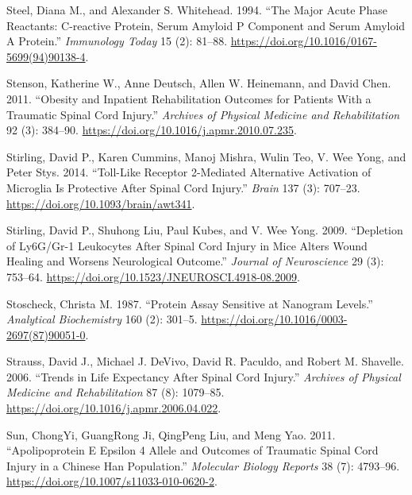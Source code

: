 \documentclass[9pt,lineno]{elife}
\newlength{\cslhangindent}
\newlength{\cslentryspacingunit} %
\newenvironment{CSLReferences}[2] %
 {%
  \setlength{\parindent}{0pt}
  \ifodd #1
  \let\oldpar\par
  \def\par{\hangindent=\cslhangindent\oldpar}
  \fi
  \setlength{\parskip}{#2\cslentryspacingunit}
 }%
 {}
\begin{document}
\begin{CSLReferences}{1}{0}
\leavevmode{}%
Steel, Diana M., and Alexander S. Whitehead. 1994. {``The Major Acute Phase Reactants: {C-reactive} Protein, Serum Amyloid {P} Component and Serum Amyloid {A} Protein.''} \emph{Immunology Today} 15 (2): 81--88. \url{https://doi.org/10.1016/0167-5699(94)90138-4}.

\leavevmode{}%
Stenson, Katherine W., Anne Deutsch, Allen W. Heinemann, and David Chen. 2011. {``Obesity and {Inpatient Rehabilitation Outcomes} for {Patients With} a {Traumatic Spinal Cord Injury}.''} \emph{Archives of Physical Medicine and Rehabilitation} 92 (3): 384--90. \url{https://doi.org/10.1016/j.apmr.2010.07.235}.

\leavevmode{}%
Stirling, David P., Karen Cummins, Manoj Mishra, Wulin Teo, V. Wee Yong, and Peter Stys. 2014. {``Toll-Like Receptor 2-Mediated Alternative Activation of Microglia Is Protective After Spinal Cord Injury.''} \emph{Brain} 137 (3): 707--23. \url{https://doi.org/10.1093/brain/awt341}.

\leavevmode{}%
Stirling, David P., Shuhong Liu, Paul Kubes, and V. Wee Yong. 2009. {``Depletion of {Ly6G}/{Gr-1 Leukocytes} After {Spinal Cord Injury} in {Mice Alters Wound Healing} and {Worsens Neurological Outcome}.''} \emph{Journal of Neuroscience} 29 (3): 753--64. \url{https://doi.org/10.1523/JNEUROSCI.4918-08.2009}.

\leavevmode{}%
Stoscheck, Christa M. 1987. {``Protein Assay Sensitive at Nanogram Levels.''} \emph{Analytical Biochemistry} 160 (2): 301--5. \url{https://doi.org/10.1016/0003-2697(87)90051-0}.

\leavevmode{}%
Strauss, David J., Michael J. DeVivo, David R. Paculdo, and Robert M. Shavelle. 2006. {``Trends in {Life Expectancy After Spinal Cord Injury}.''} \emph{Archives of Physical Medicine and Rehabilitation} 87 (8): 1079--85. \url{https://doi.org/10.1016/j.apmr.2006.04.022}.

\leavevmode{}%
Sun, ChongYi, GuangRong Ji, QingPeng Liu, and Meng Yao. 2011. {``Apolipoprotein {E} Epsilon 4 Allele and Outcomes of Traumatic Spinal Cord Injury in a {Chinese Han} Population.''} \emph{Molecular Biology Reports} 38 (7): 4793--96. \url{https://doi.org/10.1007/s11033-010-0620-2}.


\end{CSLReferences}
\end{document}
